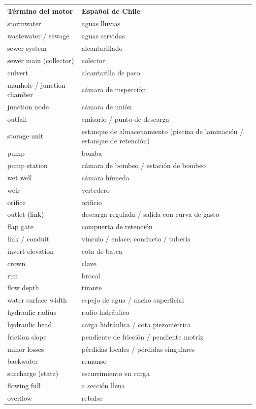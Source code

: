 \documentclass[11pt,a4paper]{article}
\begin{document}
\begin{longtable}{>{\raggedright}p{6.2cm}>{\raggedright\arraybackslash}p{9.2cm}}
\toprule
\textbf{Término del motor} & \textbf{Español de Chile} \\
\midrule
\endhead
stormwater & aguas lluvias \\
wastewater / sewage & aguas servidas \\
sewer system & alcantarillado \\
sewer main (collector) & colector \\
culvert & alcantarilla de paso \\
manhole / junction chamber & cámara de inspección \\
junction node & cámara de unión \\
outfall & emisario / punto de descarga \\
storage unit & estanque de almacenamiento (piscina de laminación / estanque de retención) \\
pump & bomba \\
pump station & cámara de bombeo / estación de bombeo \\
wet well & cámara húmeda \\
weir & vertedero \\
orifice & orificio \\
outlet (link) & descarga regulada / salida con curva de gasto \\
flap gate & compuerta de retención \\
link / conduit & vínculo / enlace; conducto / tubería \\
invert elevation & cota de batea \\
crown & clave \\
rim & brocal \\
flow depth & tirante \\
water surface width & espejo de agua / ancho superficial \\
hydraulic radius & radio hidráulico \\
hydraulic head & carga hidráulica / cota piezométrica \\
friction slope & pendiente de fricción / pendiente motriz \\
minor losses & pérdidas locales / pérdidas singulares \\
backwater & remanso \\
surcharge (state) & escurrimiento en carga \\
flowing full & a sección llena \\
overflow & rebalse \\

\end{longtable}
\end{document}
